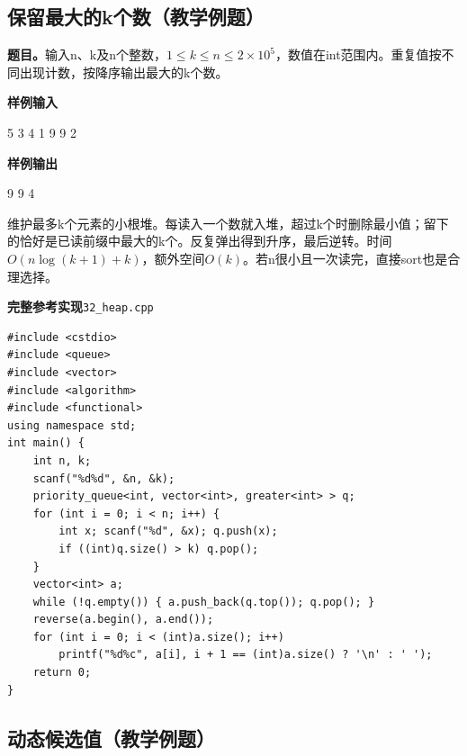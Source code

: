 \documentclass[UTF8,11pt,a4paper,fontset=none]{ctexart}
\begin{document}
\subsection{保留最大的k个数（教学例题）}

\noindent\textbf{题目。}输入n、k及n个整数，$1\le k\le n\le2\times10^5$，数值在int范围内。重复值按不同出现计数，按降序输出最大的k个数。
\begin{tcolorbox}[samplebox,title={输入输出样例}]
\textbf{样例输入}
\begin{Sample}
5 3
4 1 9 9 2
\end{Sample}
\tcblower
\textbf{样例输出}
\begin{Sample}
9 9 4
\end{Sample}
\end{tcolorbox}

维护最多k个元素的小根堆。每读入一个数就入堆，超过k个时删除最小值；留下的恰好是已读前缀中最大的k个。反复弹出得到升序，最后逆转。时间$O(n\log(k+1)+k)$，额外空间$O(k)$。若n很小且一次读完，直接sort也是合理选择。
\par\noindent\begin{minipage}{\linewidth}
\textbf{完整参考实现}\quad\texttt{32\_heap.cpp}
\begin{lstlisting}
#include <cstdio>
#include <queue>
#include <vector>
#include <algorithm>
#include <functional>
using namespace std;
int main() {
    int n, k;
    scanf("%d%d", &n, &k);
    priority_queue<int, vector<int>, greater<int> > q;
    for (int i = 0; i < n; i++) {
        int x; scanf("%d", &x); q.push(x);
        if ((int)q.size() > k) q.pop();
    }
    vector<int> a;
    while (!q.empty()) { a.push_back(q.top()); q.pop(); }
    reverse(a.begin(), a.end());
    for (int i = 0; i < (int)a.size(); i++)
        printf("%d%c", a[i], i + 1 == (int)a.size() ? '\n' : ' ');
    return 0;
}
\end{lstlisting}
\end{minipage}\par

\subsection{动态候选值（教学例题）}
\end{document}
